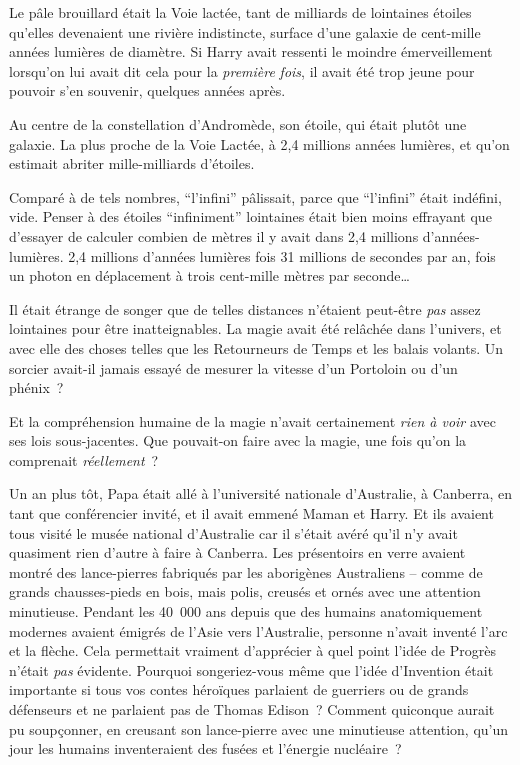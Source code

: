 Le pâle brouillard était la Voie lactée, tant de milliards de lointaines étoiles qu'elles devenaient une rivière indistincte, surface d'une galaxie de cent-mille années lumières de diamètre. Si Harry avait ressenti le moindre émerveillement lorsqu'on lui avait dit cela pour la \emph{première} \emph{fois}, il avait été trop jeune pour pouvoir s'en souvenir, quelques années après.

Au centre de la constellation d'Andromède, son étoile, qui était plutôt une galaxie. La plus proche de la Voie Lactée, à 2,4 millions années lumières, et qu'on estimait abriter mille-milliards d'étoiles.

Comparé à de tels nombres, “l'infini” pâlissait, parce que “l'infini” était indéfini, vide. Penser à des étoiles “infiniment” lointaines était bien moins effrayant que d'essayer de calculer combien de mètres il y avait dans 2,4 millions d'années-lumières. 2,4 millions d'années lumières fois 31 millions de secondes par an, fois un photon en déplacement à trois cent-mille mètres par seconde…

Il était étrange de songer que de telles distances n'étaient peut-être \emph{pas} assez lointaines pour être inatteignables. La magie avait été relâchée dans l'univers, et avec elle des choses telles que les Retourneurs de Temps et les balais volants. Un sorcier avait-il jamais essayé de mesurer la vitesse d'un Portoloin ou d'un phénix~?

Et la compréhension humaine de la magie n'avait certainement \emph{rien à voir} avec ses lois sous-jacentes. Que pouvait-on faire avec la magie, une fois qu'on la comprenait \emph{réellement}~?

Un an plus tôt, Papa était allé à l'université nationale d'Australie, à Canberra, en tant que conférencier invité, et il avait emmené Maman et Harry. Et ils avaient tous visité le musée national d'Australie car il s'était avéré qu'il n'y avait quasiment rien d'autre à faire à Canberra. Les présentoirs en verre avaient montré des lance-pierres fabriqués par les aborigènes Australiens -- comme de grands chausses-pieds en bois, mais polis, creusés et ornés avec une attention minutieuse. Pendant les 40~000 ans depuis que des humains anatomiquement modernes avaient émigrés de l'Asie vers l'Australie, personne n'avait inventé l'arc et la flèche. Cela permettait vraiment d'apprécier à quel point l'idée de Progrès n'était \emph{pas} évidente. Pourquoi songeriez-vous même que l'idée d'Invention était importante si tous vos contes héroïques parlaient de guerriers ou de grands défenseurs et ne parlaient pas de Thomas Edison~? Comment quiconque aurait pu soupçonner, en creusant son lance-pierre avec une minutieuse attention, qu'un jour les humains inventeraient des fusées et l'énergie nucléaire~?

